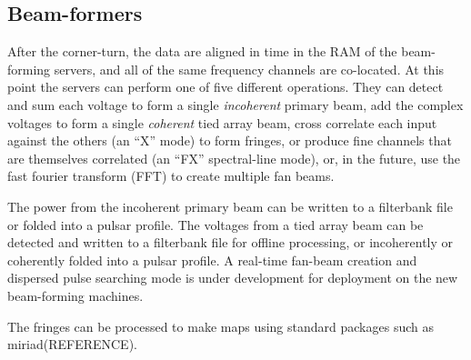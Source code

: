 \subsection{Beam-formers}

After the corner-turn, the data are aligned in time in the RAM of the beam-forming servers, and all of the same frequency channels are co-located. At this point the servers can perform one of five different operations. They can detect and sum each voltage to form a single \textit{incoherent} primary beam, add the complex voltages to form a single \textit{coherent} tied array beam, cross correlate each input against the others (an ``X'' mode) to form fringes, or produce fine channels that are themselves correlated (an ``FX'' spectral-line mode), or, in the future, use the fast fourier transform (FFT) to create multiple fan beams. 

The power from the incoherent primary beam can be written to a filterbank file or folded into a pulsar profile. The voltages from a tied array beam can be detected and written to a filterbank file for offline processing, or incoherently or coherently folded into a pulsar profile. A real-time fan-beam creation and dispersed pulse searching mode is under development for deployment on the new beam-forming machines.

The fringes can be processed to make maps using standard packages such as miriad(REFERENCE).